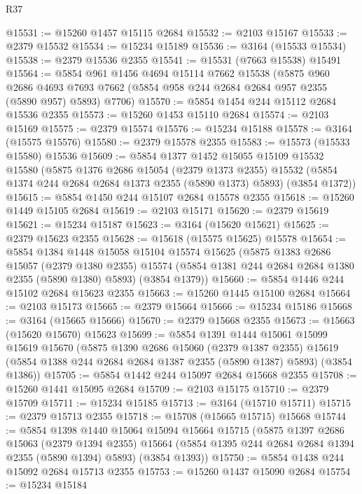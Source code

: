 \begin{lexlean}{R37}
\begin{coremodule}
@15531 := @15260 @1457 @15115 @2684
@15532 := @2103 @15167
@15533 := @2379 @15532
@15534 := @15234 @15189
@15536 := @3164 (@15533 @15534)
@15538 := @2379 @15536 @2355
@15541 := @15531 (@7663 @15538) @15491
@15564 := @5854
    @961
    @1456
    @4694
    @15114
    @7662
    @15538
    (@5875
      @960
      @2686
      @4693
      @7693
      @7662
      (@5854 @958 @244 @2684 @2684 @957 @2355 (@5890 @957) @5893)
      @7706)
@15570 := @5854 @1454 @244 @15112 @2684 @15536 @2355
@15573 := @15260 @1453 @15110 @2684
@15574 := @2103 @15169
@15575 := @2379 @15574
@15576 := @15234 @15188
@15578 := @3164 (@15575 @15576)
@15580 := @2379 @15578 @2355
@15583 := @15573 (@15533 @15580) @15536
@15609 := @5854
    @1377
    @1452
    @15055
    @15109
    @15532
    @15580
    (@5875
      @1376
      @2686
      @15054
      (@2379 @1373 @2355)
      @15532
      (@5854 @1374 @244 @2684 @2684 @1373 @2355 (@5890 @1373) @5893)
      (@3854 @1372))
@15615 := @5854 @1450 @244 @15107 @2684 @15578 @2355
@15618 := @15260 @1449 @15105 @2684
@15619 := @2103 @15171
@15620 := @2379 @15619
@15621 := @15234 @15187
@15623 := @3164 (@15620 @15621)
@15625 := @2379 @15623 @2355
@15628 := @15618 (@15575 @15625) @15578
@15654 := @5854
    @1384
    @1448
    @15058
    @15104
    @15574
    @15625
    (@5875
      @1383
      @2686
      @15057
      (@2379 @1380 @2355)
      @15574
      (@5854 @1381 @244 @2684 @2684 @1380 @2355 (@5890 @1380) @5893)
      (@3854 @1379))
@15660 := @5854 @1446 @244 @15102 @2684 @15623 @2355
@15663 := @15260 @1445 @15100 @2684
@15664 := @2103 @15173
@15665 := @2379 @15664
@15666 := @15234 @15186
@15668 := @3164 (@15665 @15666)
@15670 := @2379 @15668 @2355
@15673 := @15663 (@15620 @15670) @15623
@15699 := @5854
    @1391
    @1444
    @15061
    @15099
    @15619
    @15670
    (@5875
      @1390
      @2686
      @15060
      (@2379 @1387 @2355)
      @15619
      (@5854 @1388 @244 @2684 @2684 @1387 @2355 (@5890 @1387) @5893)
      (@3854 @1386))
@15705 := @5854 @1442 @244 @15097 @2684 @15668 @2355
@15708 := @15260 @1441 @15095 @2684
@15709 := @2103 @15175
@15710 := @2379 @15709
@15711 := @15234 @15185
@15713 := @3164 (@15710 @15711)
@15715 := @2379 @15713 @2355
@15718 := @15708 (@15665 @15715) @15668
@15744 := @5854
    @1398
    @1440
    @15064
    @15094
    @15664
    @15715
    (@5875
      @1397
      @2686
      @15063
      (@2379 @1394 @2355)
      @15664
      (@5854 @1395 @244 @2684 @2684 @1394 @2355 (@5890 @1394) @5893)
      (@3854 @1393))
@15750 := @5854 @1438 @244 @15092 @2684 @15713 @2355
@15753 := @15260 @1437 @15090 @2684
@15754 := @15234 @15184

\end{coremodule}
\end{lexlean}
